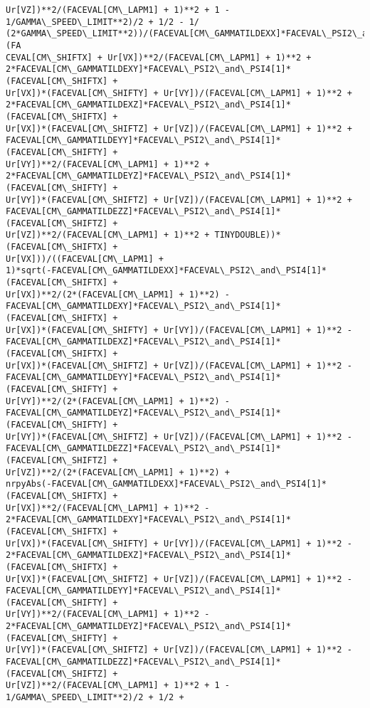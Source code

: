 \documentclass[landscape,letterpaper,10pt,english]{article}
\begin{document}
\begin{Verbatim}[commandchars=\\\{\}]
Ur[VZ])**2/(FACEVAL[CM\_LAPM1] + 1)**2 + 1 - 1/GAMMA\_SPEED\_LIMIT**2)/2 + 1/2 - 1/
(2*GAMMA\_SPEED\_LIMIT**2))/(FACEVAL[CM\_GAMMATILDEXX]*FACEVAL\_PSI2\_and\_PSI4[1]*(FA
CEVAL[CM\_SHIFTX] + Ur[VX])**2/(FACEVAL[CM\_LAPM1] + 1)**2 +
2*FACEVAL[CM\_GAMMATILDEXY]*FACEVAL\_PSI2\_and\_PSI4[1]*(FACEVAL[CM\_SHIFTX] +
Ur[VX])*(FACEVAL[CM\_SHIFTY] + Ur[VY])/(FACEVAL[CM\_LAPM1] + 1)**2 +
2*FACEVAL[CM\_GAMMATILDEXZ]*FACEVAL\_PSI2\_and\_PSI4[1]*(FACEVAL[CM\_SHIFTX] +
Ur[VX])*(FACEVAL[CM\_SHIFTZ] + Ur[VZ])/(FACEVAL[CM\_LAPM1] + 1)**2 +
FACEVAL[CM\_GAMMATILDEYY]*FACEVAL\_PSI2\_and\_PSI4[1]*(FACEVAL[CM\_SHIFTY] +
Ur[VY])**2/(FACEVAL[CM\_LAPM1] + 1)**2 +
2*FACEVAL[CM\_GAMMATILDEYZ]*FACEVAL\_PSI2\_and\_PSI4[1]*(FACEVAL[CM\_SHIFTY] +
Ur[VY])*(FACEVAL[CM\_SHIFTZ] + Ur[VZ])/(FACEVAL[CM\_LAPM1] + 1)**2 +
FACEVAL[CM\_GAMMATILDEZZ]*FACEVAL\_PSI2\_and\_PSI4[1]*(FACEVAL[CM\_SHIFTZ] +
Ur[VZ])**2/(FACEVAL[CM\_LAPM1] + 1)**2 + TINYDOUBLE))*(FACEVAL[CM\_SHIFTX] +
Ur[VX]))/((FACEVAL[CM\_LAPM1] +
1)*sqrt(-FACEVAL[CM\_GAMMATILDEXX]*FACEVAL\_PSI2\_and\_PSI4[1]*(FACEVAL[CM\_SHIFTX] +
Ur[VX])**2/(2*(FACEVAL[CM\_LAPM1] + 1)**2) -
FACEVAL[CM\_GAMMATILDEXY]*FACEVAL\_PSI2\_and\_PSI4[1]*(FACEVAL[CM\_SHIFTX] +
Ur[VX])*(FACEVAL[CM\_SHIFTY] + Ur[VY])/(FACEVAL[CM\_LAPM1] + 1)**2 -
FACEVAL[CM\_GAMMATILDEXZ]*FACEVAL\_PSI2\_and\_PSI4[1]*(FACEVAL[CM\_SHIFTX] +
Ur[VX])*(FACEVAL[CM\_SHIFTZ] + Ur[VZ])/(FACEVAL[CM\_LAPM1] + 1)**2 -
FACEVAL[CM\_GAMMATILDEYY]*FACEVAL\_PSI2\_and\_PSI4[1]*(FACEVAL[CM\_SHIFTY] +
Ur[VY])**2/(2*(FACEVAL[CM\_LAPM1] + 1)**2) -
FACEVAL[CM\_GAMMATILDEYZ]*FACEVAL\_PSI2\_and\_PSI4[1]*(FACEVAL[CM\_SHIFTY] +
Ur[VY])*(FACEVAL[CM\_SHIFTZ] + Ur[VZ])/(FACEVAL[CM\_LAPM1] + 1)**2 -
FACEVAL[CM\_GAMMATILDEZZ]*FACEVAL\_PSI2\_and\_PSI4[1]*(FACEVAL[CM\_SHIFTZ] +
Ur[VZ])**2/(2*(FACEVAL[CM\_LAPM1] + 1)**2) +
nrpyAbs(-FACEVAL[CM\_GAMMATILDEXX]*FACEVAL\_PSI2\_and\_PSI4[1]*(FACEVAL[CM\_SHIFTX] +
Ur[VX])**2/(FACEVAL[CM\_LAPM1] + 1)**2 -
2*FACEVAL[CM\_GAMMATILDEXY]*FACEVAL\_PSI2\_and\_PSI4[1]*(FACEVAL[CM\_SHIFTX] +
Ur[VX])*(FACEVAL[CM\_SHIFTY] + Ur[VY])/(FACEVAL[CM\_LAPM1] + 1)**2 -
2*FACEVAL[CM\_GAMMATILDEXZ]*FACEVAL\_PSI2\_and\_PSI4[1]*(FACEVAL[CM\_SHIFTX] +
Ur[VX])*(FACEVAL[CM\_SHIFTZ] + Ur[VZ])/(FACEVAL[CM\_LAPM1] + 1)**2 -
FACEVAL[CM\_GAMMATILDEYY]*FACEVAL\_PSI2\_and\_PSI4[1]*(FACEVAL[CM\_SHIFTY] +
Ur[VY])**2/(FACEVAL[CM\_LAPM1] + 1)**2 -
2*FACEVAL[CM\_GAMMATILDEYZ]*FACEVAL\_PSI2\_and\_PSI4[1]*(FACEVAL[CM\_SHIFTY] +
Ur[VY])*(FACEVAL[CM\_SHIFTZ] + Ur[VZ])/(FACEVAL[CM\_LAPM1] + 1)**2 -
FACEVAL[CM\_GAMMATILDEZZ]*FACEVAL\_PSI2\_and\_PSI4[1]*(FACEVAL[CM\_SHIFTZ] +
Ur[VZ])**2/(FACEVAL[CM\_LAPM1] + 1)**2 + 1 - 1/GAMMA\_SPEED\_LIMIT**2)/2 + 1/2 +

\end{Verbatim}
\end{document}

